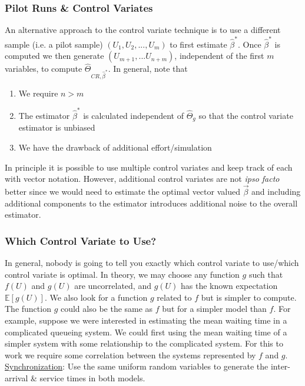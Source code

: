 \documentclass[12pt]{article}
\newlength\tindent
\renewcommand{\indent}{\hspace*{\tindent}}
\begin{document}
\subsubsection{Pilot Runs \& Control Variates}

\indent An alternative approach to the control variate technique is to use a different sample (i.e. a pilot sample) $(U_1, U_2, ..., U_m)$ to first estimate $\hat{\beta}^*$. Once $\hat{\beta}^*$ is computed we then generate $(U_{m+1}, ... U_{n+m})$, independent of the first $m$ variables, to compute $\hat{\Theta}_{CR,\hat{\beta}^*}$. In general, note that
\begin{enumerate}
	\item We require $n > m$
	\item The estimator $\hat{\beta}^*$ is calculated independent of $\hat{\Theta}_g$ so that the control variate estimator is unbiased 
	\item We have the drawback of additional effort/simulation
\end{enumerate}

\indent In principle it is possible to use multiple control variates and keep track of each with vector notation. However, additional control variates are not {\em ipso facto} better since we would need to estimate the optimal vector valued $\vec{\beta}$ and including additional components to the estimator introduces additional noise to the overall estimator. \\

\subsubsection{Which Control Variate to Use?}

\indent In general, nobody is going to tell you exactly which control variate to use/which control variate is optimal. In theory, we may choose any function $g$ such that $f(U)$ and $g(U)$ are uncorrelated, and $g(U)$ has the known expectation $\mathbb E[g(U)]$. We also look for a function $g$ related to $f$ but is simpler to compute. \\

\indent The function $g$ could also be the same as $f$ but for a simpler model than $f$. For example, suppose we were interested in estimating the mean waiting time in a complicated queueing system. We could first using the mean waiting time of a simpler system with some relationship to the complicated system. For this to work we require some correlation between the systems represented by $f$ and $g$. \underline{Synchronization}: Use the same uniform random variables to generate the inter-arrival \& service times in both models.
\end{document}
